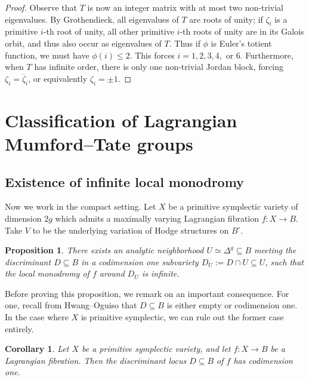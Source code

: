 \documentclass[12pt]{amsart}
\newcommand{\ol}{\overline}
\newtheorem{proposition}[theorem]{Proposition}
\newtheorem{corollary}[theorem]{Corollary}
\theoremstyle{definition}
\numberwithin{equation}{section}
\begin{document}
\begin{proof}
Observe that \(T\) is now an integer matrix with at most two non-trivial eigenvalues. 
By Grothendieck, all eigenvalues of \(T\) are roots of unity; if \(\zeta_i\) is a
primitive \(i\)-th root of unity, all other primitive \(i\)-th roots of unity 
are in its Galois orbit, and thus also occur as eigenvalues of \(T\). Thus 
if \(\phi\) is Euler's totient function, we must have \(\phi(i) \leq 2\). This 
forces \(i = 1,2,3,4,\) or \(6\). Furthermore, when \(T\) has infinite order,
there is only one non-trivial Jordan block, forcing \(\zeta_i = \ol{\zeta}_i\), 
or equivalently \(\zeta_i = \pm 1\).
\end{proof}





\section{Classification of Lagrangian Mumford--Tate groups}



\subsection{Existence of infinite local monodromy}


Now we work in the compact setting. Let \(X\) be a primitive symplectic variety of 
dimension \(2g\) which admits a maximally varying Lagrangian fibration \(f: X \to B\).
Take \(V\) to be the underlying variation of Hodge structures on \(B^\circ\).

\begin{proposition} \label{infinite-monodromy}
There exists an analytic neighborhood \(U \simeq \Delta^g \subseteq B\) meeting 
the discriminant \(D \subseteq B\) in a codimension one subvariety 
\(D_U := D \cap U \subseteq U\), such that the local monodromy of \(f\) around 
\(D_U\) is infinite.
\end{proposition}

Before proving this proposition, we remark on an important consequence. 
For one, recall from Hwang--Oguiso \cite{hwang-oguiso09} that \(D \subseteq B\) 
is either empty or codimension one. In the case where \(X\) is primitive symplectic, 
we can rule out the former case entirely.

\begin{corollary} \label{codim-one-discriminant}
    Let \(X\) be a primitive symplectic variety, and let \(f: X \to B\) be a Lagrangian
    fibration. Then the discriminant locus \(D \subseteq B\) of \(f\) has codimension one.
\end{corollary}
\end{document}
